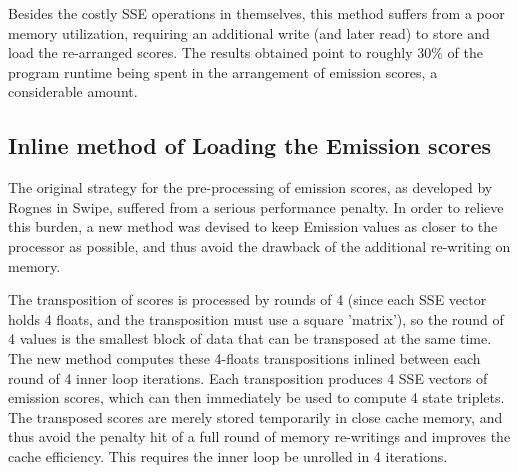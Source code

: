 %
%

Besides the costly SSE operations in themselves, this method suffers from a poor memory utilization, requiring an additional write (and later read) to store and load the re-arranged scores. The results obtained point to roughly 30\% of the program runtime being spent in the arrangement of emission scores, a considerable amount.



\subsection{Inline method of Loading the Emission scores}

The original strategy for the pre-processing of emission scores, as developed by Rognes in Swipe, suffered from a serious performance penalty. In order to relieve this burden,  a new method was devised to keep Emission values as closer to the processor as possible, and thus avoid the drawback of the additional re-writing on memory. 

The transposition of scores is processed by rounds of 4 (since each SSE vector holds 4 floats, and the transposition must use a square 'matrix'), so the round of 4 values is the smallest block of data that can be transposed at the same time. The new method computes these 4-floats transpositions inlined between each round of 4 inner loop iterations. Each transposition produces 4 SSE vectors of emission scores, which can then immediately be used to compute 4 state triplets. The transposed scores are merely stored temporarily in close cache memory, and thus avoid the penalty hit of a full round of memory re-writings and improves the cache efficiency. This requires the inner loop be unrolled in 4 iterations.

